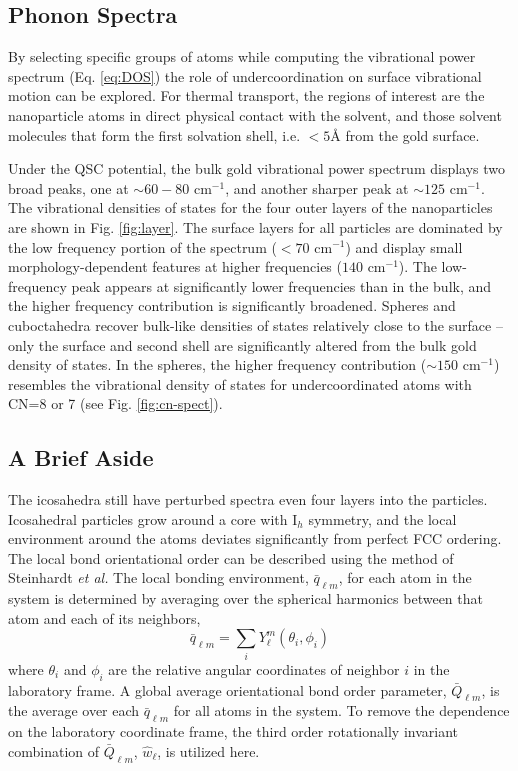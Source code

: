 \subsection{Phonon Spectra}
By selecting specific groups of atoms while computing the vibrational
power spectrum (Eq. \ref{eq:DOS}) the role of
undercoordination on surface vibrational motion can be explored. For thermal
transport, the regions of interest are the nanoparticle atoms in
direct physical contact with the solvent, and those solvent molecules
that form the first solvation shell, i.e. $< 5 \text{\AA}$ from the
gold surface.

Under the QSC potential, the bulk gold vibrational power spectrum
displays two broad peaks, one at $\sim 60-80 \text{~cm}^{-1}$, and
another sharper peak at $\sim 125 \text{~cm}^{-1}$.  The vibrational
densities of states for the four outer layers of the nanoparticles are
shown in Fig. \ref{fig:layer}.  The surface layers for all particles
are dominated by the low frequency portion of the spectrum
($<70 \text{~cm}^{-1}$) and display small morphology-dependent
features at higher frequencies ($140 \text{~cm}^{-1}$). The
low-frequency peak appears at significantly lower frequencies than in
the bulk, and the higher frequency contribution is significantly
broadened.  Spheres and cuboctahedra recover bulk-like densities of
states relatively close to the surface -- only the surface and second
shell are significantly altered from the bulk gold density of
states. In the spheres, the higher frequency contribution
($\sim 150 \text{~cm}^{-1}$) resembles the vibrational density of
states for undercoordinated atoms with CN=8 or 7 (see 
Fig. \ref{fig:cn-spect}).

\subsection{A Brief Aside}
The icosahedra still have perturbed spectra even four layers into the
particles. Icosahedral particles grow around a core with
$\mathrm{I}_h$ symmetry, and the local environment around the atoms
deviates significantly from perfect FCC ordering.  The local bond
orientational order can be described using the method of Steinhardt
\textit{et al.}\cite{Steinhardt1983} 
The local bonding environment,
$\bar{q}_{\ell m}$, for each atom in the system is determined by
averaging over the spherical harmonics between that atom and each of
its neighbors,
\begin{equation}
\bar{q}_{\ell m} = \sum_i Y_\ell^m(\theta_i, \phi_i)
\end{equation}
where $\theta_i$ and $\phi_i$ are the relative angular coordinates of
neighbor $i$ in the laboratory frame.  A global average orientational
bond order parameter, $\bar{Q}_{\ell m}$, is the average over each
$\bar{q}_{\ell m}$ for all atoms in the system. To remove the
dependence on the laboratory coordinate frame, the third order
rotationally invariant combination of $\bar{Q}_{\ell m}$,
$\hat{w}_\ell$, is utilized here.\cite{Steinhardt1983,Vardeman:2008fk}


